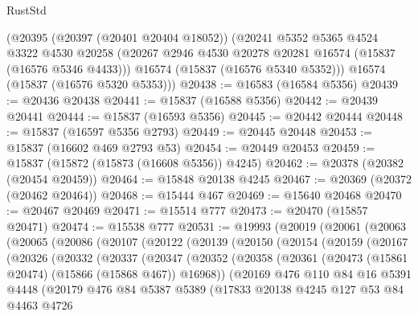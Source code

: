 \begin{lexlean}{RustStd}
\begin{coremodule}
{\begin{coremodule}
{{{{{{{{{{{{{{{{{{{{{{{{{{{{{{{{{{{{{{{{{{{{{{{{{{{{{{{{{{{{    (@20395
      (@20397 (@20401 @20404 @18052))
      (@20241
        @5352
        @5365
        @4524
        @3322
        @4530
        @20258
        (@20267 @2946 @4530 @20278 @20281 @16574 (@15837 (@16576 @5346 @4433)))
        @16574
        (@15837 (@16576 @5340 @5352)))
      @16574
      (@15837 (@16576 @5320 @5353)))
@20438 := @16583 (@16584 @5356)
@20439 := @20436 @20438
@20441 := @15837 (@16588 @5356)
@20442 := @20439 @20441
@20444 := @15837 (@16593 @5356)
@20445 := @20442 @20444
@20448 := @15837 (@16597 @5356 @2793)
@20449 := @20445 @20448
@20453 := @15837 (@16602 @469 @2793 @53)
@20454 := @20449 @20453
@20459 := @15837 (@15872 (@15873 (@16608 @5356)) @4245)
@20462 := @20378 (@20382 (@20454 @20459))
@20464 := @15848 @20138 @4245
@20467 := @20369 (@20372 (@20462 @20464))
@20468 := @15444 @467
@20469 := @15640 @20468
@20470 := @20467 @20469
@20471 := @15514 @777
@20473 := @20470 (@15857 @20471)
@20474 := @15538 @777
@20531 := @19993
    (@20019
      (@20061
        (@20063
          (@20065
            (@20086
              (@20107
                (@20122
                  (@20139
                    (@20150
                      (@20154
                        (@20159
                          (@20167
                            (@20326
                              (@20332
                                (@20337
                                  (@20347
                                    (@20352
                                      (@20358
                                        (@20361
                                          (@20473 (@15861 @20474) (@15866 (@15868 @467)) @16968))
                                        (@20169
                                          @476
                                          @110
                                          @84
                                          @16
                                          @5391
                                          @4448
                                          (@20179
                                            @476
                                            @84
                                            @5387
                                            @5389
                                            (@17833
                                              @20138
                                              @4245
                                              @127
                                              @53
                                              @84
                                              @4463
                                              @4726
}}}}}}}}}}}}}}}}}}}}}}}}}}}}}}}}}}}}}}}}}}}}}}}}}}}}}}}}}}}}
\end{coremodule}}
\end{coremodule}
\end{lexlean}
